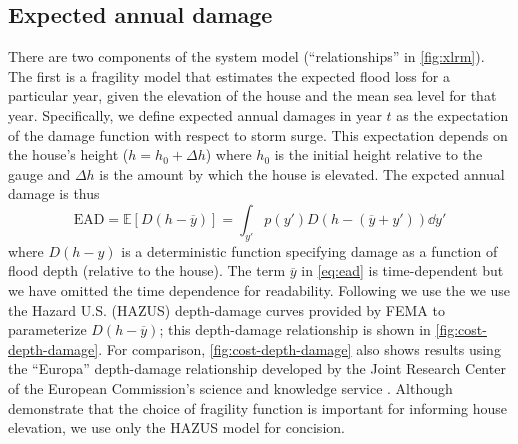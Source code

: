 \documentclass[12pt]{article}
\begin{document}
\subsection{Expected annual damage}\label{sec:ead}

There are two components of the system model (``relationships'' in \cref{fig:xlrm}).
The first is a fragility model that estimates the expected flood loss for a particular year, given the elevation of the house and the mean sea level for that year.
Specifically, we define expected annual damages in year $t$ as the expectation of the damage function with respect to storm surge.
This expectation depends on the house's height ($h = h_0 + \Delta h$) where $h_0$ is the initial height relative to the gauge and $\Delta h$ is the amount by which the house is elevated.
The expcted annual damage is thus
\begin{equation}\label{eq:ead}
    \textrm{EAD} = \mathbb{E}[D(h-\overline{y})] = \int_{y'} p(y') D(h - (\overline{y} + y')) \dd{y'}
\end{equation}
where $D(h-y)$ is a deterministic function specifying damage as a function of flood depth (relative to the house).
The term $\overline{y}$ in \cref{eq:ead} is time-dependent but we have omitted the time dependence for readability.
Following \citet{zarekarizi_suboptimal:2020} we use the we use the Hazard U.S. (HAZUS) depth-damage curves provided by FEMA to parameterize $D(h-\overline{y})$; this depth-damage relationship is shown in \cref{fig:cost-depth-damage}.
For comparison, \cref{fig:cost-depth-damage} also shows results using the ``Europa'' depth-damage relationship developed by the Joint Research Center of the European Commission's science and knowledge service \citep{huizinga_depthdamage:2016}.
Although \citet{zarekarizi_suboptimal:2020} demonstrate that the choice of fragility function is important for informing house elevation, we use only the HAZUS model for concision.
\end{document}
